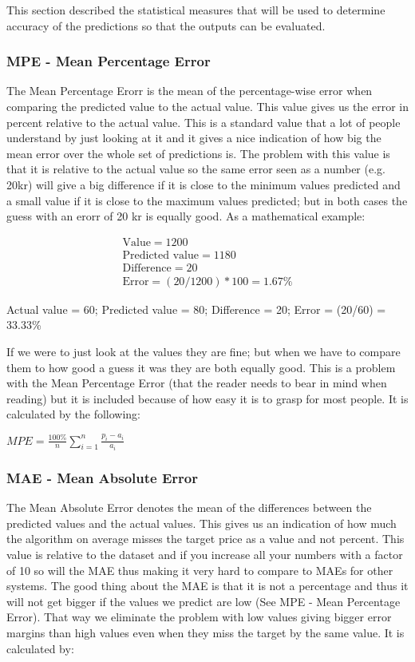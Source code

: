 This section described the statistical measures that will be used to determine accuracy of the predictions so that the outputs can be evaluated.

\subsubsection{MPE - Mean Percentage Error}
The Mean Percentage Erorr is the mean of the percentage-wise error when comparing the predicted value to the actual value. This value gives us the error in percent relative to the actual value. This is a standard value that a lot of people understand by just looking at it and it gives a nice indication of how big the mean error over the whole set of predictions is. The problem with this value is that it is relative to the actual value so the same error seen as a number (e.g. 20kr) will give a big difference if it is close to the minimum values predicted and a small value if it is close to the maximum values predicted; but in both cases the guess with an erorr of 20 kr is equally good. As a mathematical example:


\begin{subequations}
\begin{align}
 \text{Value} = 1200 \\
 \text{Predicted value} = 1180\\
 \text{Difference} = 20\\
 \text{Error} = (20/1200)*100 = 1.67\%
\end{align}
\end{subequations}
\centerline{Actual value = 60; Predicted value = 80; Difference = 20; Error = (20/60) = 33.33\%}


If we were to just look at the values they are fine; but when we have to compare them to how good a guess it was they are both equally good. This is a problem with the Mean Percentage Error (that the reader needs to bear in mind when reading) but it is included because of how easy it is to grasp for most people.
It is calculated by the following:

\centerline{$ MPE = \frac{100\%}{n}\sum_{i=1}^{n}\frac{p_i - a_i}{a_i} $}


\subsubsection{MAE - Mean Absolute Error}
\label{sec:maeStatistics}
The Mean Absolute Error denotes the mean of the differences between the predicted values and the actual values. This gives us an indication of how much the algorithm on average misses the target price as a value and not percent. This value is relative to the dataset and if you increase all your numbers with a factor of 10 so will the MAE thus making it very hard to compare to MAEs for other systems. The good thing about the MAE is that it is not a percentage and thus it will not get bigger if the values we predict are low (See MPE - Mean Percentage Error). That way we eliminate the problem with low values giving bigger error margins than high values even when they miss the target by the same value. It is calculated by:



